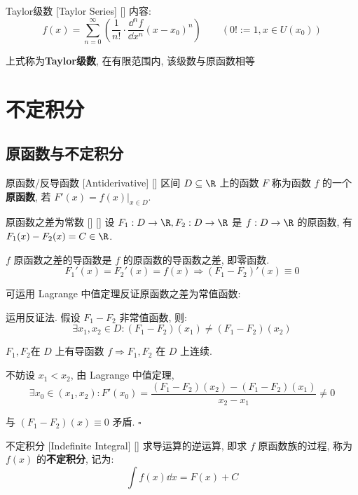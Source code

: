 \documentclass[UTF8]{ctexart}
\begin{document}
			\begin{dfn}
			    []
			    {Taylor级数}
			    [Taylor Series]
			    []
				内容: 
				\[f(x)=\sum_{n=0}^{\infty}\left(\frac{1}{n!}\cdot\frac{\dd^n f}{\dd x^n}(x-x_0)^n\right)\qquad(0!:=1, x\in U(x_0))\]
				
				上式称为\textbf{Taylor级数}, 在有限范围内, 该级数与原函数相等
			\end{dfn}
				
		
	\section{不定积分}
		
		\subsection{原函数与不定积分}
			
			\begin{dfn}
			    []
			    {原函数/反导函数}
			    [Antiderivative]
			    []
				区间 \(D\subseteq\R\) 上的函数 \(F\) 称为函数 \(f\) 的一个\textbf{原函数}, 若 \(F'(x)=f(x)|_{x\in D}\). 
			\end{dfn}
			
			\begin{ppt}
			    []
			    {原函数之差为常数}
			    []
			    []
				设 \(F_1:D\to\R,F_2:D\to\R\) 是 \(f:D\to\R\) 的原函数, 有 \(F_1(x)-F_2(x)=C\in\R\). 
			\end{ppt}
			
			\begin{prf}
				\(f\) 原函数之差的导函数是 \(f\) 的原函数的导函数之差, 即零函数. 
				\[F_1'(x)=F_2'(x)=f(x)\Longrightarrow (F_1-F_2)'(x)\equiv0\]
				
				可运用 Lagrange 中值定理反证原函数之差为常值函数: 

				运用反证法. 假设 \(F_1-F_2\) 非常值函数, 则: 
				\[\exists x_1,x_2\in D: (F_1-F_2)(x_1)\neq(F_1-F_2)(x_2)\]
				
				\(F_1,F_2\)在 \(D\) 上有导函数 \(f\Longrightarrow F_1,F_2\) 在 \(D\) 上连续. 
				
				不妨设 \(x_1<x_2\), 由 Lagrange 中值定理, 
				\[\exists x_0\in (x_1,x_2): F'(x_0)=\frac{(F_1-F_2)(x_2)-(F_1-F_2)(x_1)}{x_2-x_1}\neq 0\]
				
				与 \((F_1-F_2)(x)\equiv 0\) 矛盾. \(\square\)
			\end{prf}
			
			\begin{dfn}
			    []
			    {不定积分 }
			    [Indefinite Integral]
			    []
				求导运算的逆运算, 即求 \(f\) 原函数族的过程, 称为 \(f(x)\) 的\textbf{不定积分}, 记为: 
				\[\int f(x)\dd x=F(x)+C\]
			\end{dfn}
			
\end{document}
